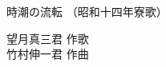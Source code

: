 \documentclass[10pt,b5j]{tarticle} %
\begin{document}
\begin{minipage}[c]{0.7\hsize} %
    \begin{center}
        {\LARGE
            時潮の流転 %
        }
        {\small 
            （昭和十四年寮歌） %
        }
    \end{center}
\end{minipage}
\begin{minipage}[c]{0.3\hsize} %
    \begin{flushright} %
        望月真三君 作歌\\竹村伸一君 作曲 %
    \end{flushright}
\end{minipage}
\end{document}
